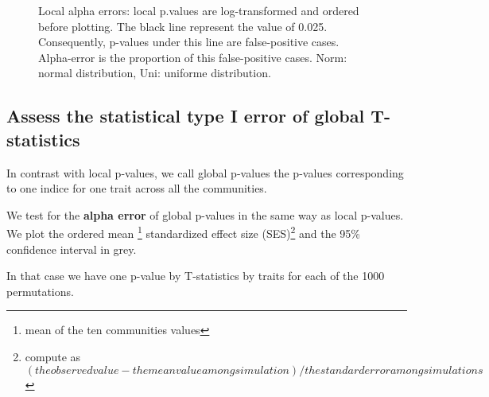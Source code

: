 \documentclass[12pt]{article}\usepackage[]{graphicx}\usepackage[]{color}
\newenvironment{knitrout}{}{} %
\begin{document}
\begin{knitrout}
\begin{figure}
{}

\caption[Local alpha errors]{Local alpha errors: local p.values are log-transformed and ordered before plotting. The black line represent the value of 0.025. Consequently, p-values under this line are false-positive cases. Alpha-error is the proportion of this false-positive cases. Norm: normal distribution, Uni: uniforme distribution.}\label{fig:No_Filter_results}
\end{figure}


\end{knitrout}

 \subsection {Assess the statistical type I error of global T-statistics}

In contrast with local p-values, we call global p-values the p-values corresponding to one indice for one trait across all the communities. 

We test for the \textbf{alpha error} of global p-values in the same way as local p-values. We plot the ordered mean \footnote{mean of the ten communities values} standardized effect size (SES)\footnote{compute as $$(the observed value - the mean value among simulation) / the standard error among simulations$$} and the 95\% confidence interval in grey. 

In that case we have one p-value by T-statistics by traits for each of the 1000 permutations.
\end{document}
